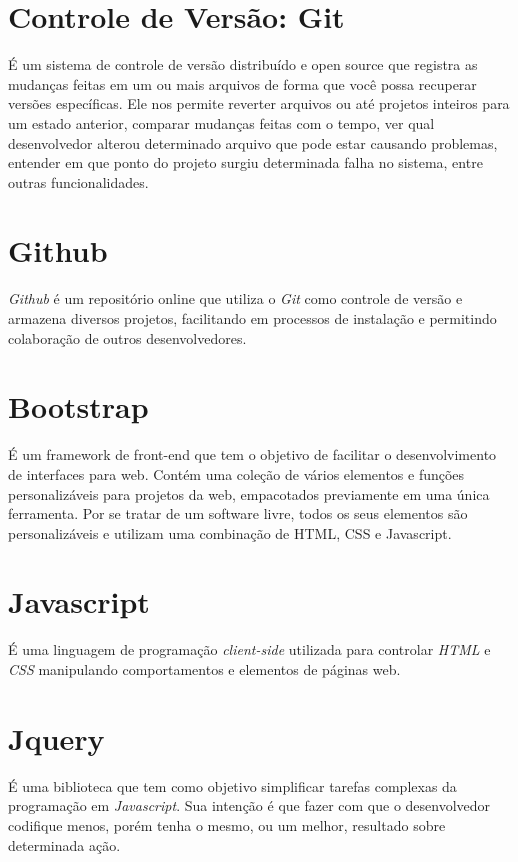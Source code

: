     \section{Controle de Versão: Git\label{sec:git}}
        É um sistema de controle de versão distribuído e open source que registra as mudanças feitas em um ou mais arquivos de forma que você possa recuperar versões específicas. Ele nos permite reverter arquivos ou até projetos inteiros para um estado anterior, comparar mudanças feitas com o tempo, ver qual desenvolvedor alterou determinado arquivo que pode estar causando problemas, entender em que ponto do projeto surgiu determinada falha no sistema, entre outras funcionalidades.

    \section{Github\label{sec:github}}
        \emph{Github} é um repositório online que utiliza o \emph{Git} como controle de versão e armazena diversos projetos, facilitando em processos de instalação e permitindo colaboração de outros desenvolvedores.


    \section{Bootstrap\label{sec:bootstrap}}
        É um framework de front-end que tem o objetivo de facilitar o desenvolvimento de interfaces para web. Contém uma coleção de vários elementos e funções personalizáveis para projetos da web, empacotados previamente em uma única ferramenta. Por se tratar de um software livre, todos os seus elementos são personalizáveis e utilizam uma combinação de HTML, CSS e Javascript.

    \section{Javascript\label{sec:javascript}}
        É uma linguagem de programação \emph{client-side} utilizada para controlar \emph{HTML} e \emph{CSS} manipulando comportamentos e elementos de páginas web.


    \section{Jquery\label{sec:jquery}}
        É uma biblioteca que tem como objetivo simplificar tarefas complexas da programação em \emph{Javascript}. Sua intenção é que fazer com que o desenvolvedor codifique menos, porém tenha o mesmo, ou um melhor, resultado sobre determinada ação.

